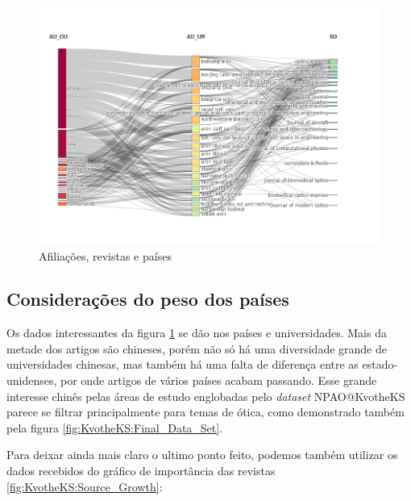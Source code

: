 \begin{figure}[H]
    \centering
    \includegraphics[width=1.1\textwidth]{experiments/KvotheKS/PesqBibliogr/AlgoritmosSimulacaoOptica-Dinamica/WoS-20220202/Dataset/AU_CO_AU_UN_SO.png}
    \caption{Afiliações, revistas e países}
    \label{fig:KvotheKS:SankeyCountry}
\end{figure}

\subsection{Considerações do peso dos países}
    Os dados interessantes da figura \ref{fig:KvotheKS:SankeyCountry} se dão nos países e universidades. Mais da metade dos artigos são chineses, porém não só há uma diversidade grande de universidades chinesas, mas também há uma falta de diferença entre as estado-unidenses, por onde artigos de vários países acabam passando. Esse grande interesse chinês pelas áreas de estudo englobadas pelo \emph{dataset} NPAO@KvotheKS parece se filtrar principalmente para temas de ótica, como demonstrado também pela figura \ref{fig:KvotheKS:Final_Data_Set}.
    
    Para deixar ainda mais claro o ultimo ponto feito, podemos também utilizar os dados recebidos do gráfico de importância das revistas \ref{fig:KvotheKS:Source_Growth}:
    
